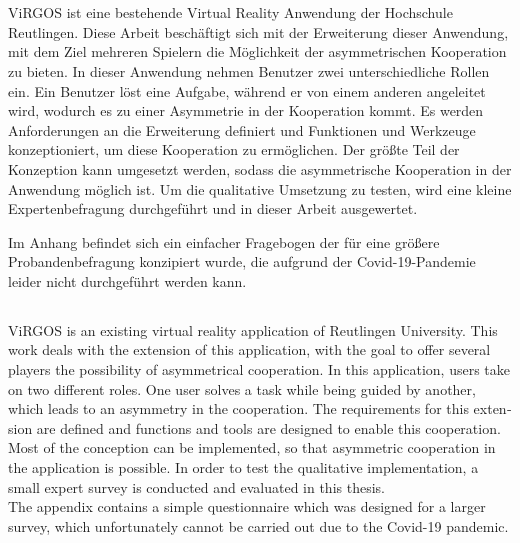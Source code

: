 \documentclass[12pt,oneside,a4paper]{article}
\begin{document}
\large


\section*{}
ViRGOS ist eine bestehende Virtual Reality Anwendung der Hochschule Reutlingen. Diese Arbeit beschäftigt sich mit der Erweiterung dieser Anwendung, mit dem Ziel mehreren Spielern die Möglichkeit der asymmetrischen Kooperation zu bieten. In dieser Anwendung nehmen Benutzer zwei unterschiedliche Rollen ein. Ein Benutzer löst eine Aufgabe, während er von einem anderen angeleitet wird, wodurch es zu einer Asymmetrie in der Kooperation kommt. Es werden Anforderungen an die Erweiterung definiert und Funktionen und Werkzeuge konzeptioniert, um diese Kooperation zu ermöglichen. Der größte Teil der Konzeption kann umgesetzt werden, sodass die asymmetrische Kooperation in der Anwendung möglich ist. Um die qualitative Umsetzung zu testen, wird eine kleine Expertenbefragung durchgeführt und in dieser Arbeit ausgewertet.\\ 

Im Anhang befindet sich ein einfacher Fragebogen der für eine größere Probandenbefragung konzipiert wurde, die aufgrund der Covid-19-Pandemie leider nicht durchgeführt werden kann.

\begin{otherlanguage}{english}
\section*{}
ViRGOS is an existing virtual reality application of Reutlingen University. This work deals with the extension of this application, with the goal to offer several players the possibility of asymmetrical cooperation. In this application, users take on two different roles. One user solves a task while being guided by another, which leads to an asymmetry in the cooperation. The requirements for this extension are defined and functions and tools are designed to enable this cooperation. Most of the conception can be implemented, so that asymmetric cooperation in the application is possible. In order to test the qualitative implementation, a small expert survey is conducted and evaluated in this thesis.\\

The appendix contains a simple questionnaire which was designed for a larger survey, which unfortunately cannot be carried out due to the Covid-19 pandemic.
\end{otherlanguage}
\end{document}
